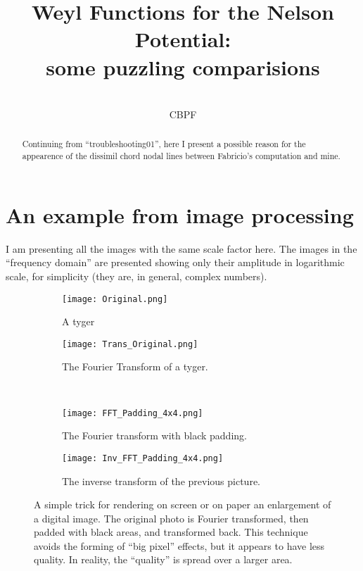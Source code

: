 \documentclass[a4paper,12pt]{article}
\title{ Weyl Functions for the Nelson Potential:\\ some puzzling comparisions}
\author{\\CBPF}
\begin{document}
\maketitle

\begin{abstract}
Continuing from ``troubleshooting01'', here I present a
possible reason for the appearence of the dissimil chord nodal
lines between Fabricio's computation and mine. 
\end{abstract}




\section{An example from image processing}

I am presenting all the images with the same scale factor
here. The images in the ``frequency domain'' are presented showing
only their amplitude in logarithmic scale, for simplicity 
(they are, in general, complex numbers).


\begin{figure}[H]
  \centering
  \begin{subfigure}[b]{0.48\textwidth}
    \centering
          \texttt{[image: Original.png]}
                \caption{A tyger}
                \label{tigre01}
  \end{subfigure}%
\begin{subfigure}[b]{0.48\textwidth}
    \centering
          \texttt{[image: Trans\_Original.png]}
                \caption{The Fourier Transform of a tyger.}
                \label{ftigre01}
  \end{subfigure}
\\
  \begin{subfigure}[b]{0.48\textwidth}
    \centering
          \texttt{[image: FFT\_Padding\_4x4.png]}
                \caption{The Fourier transform with black padding.}
                \label{ftigreynegro01}
  \end{subfigure}%
\begin{subfigure}[b]{0.48\textwidth}
    \centering
          \texttt{[image: Inv\_FFT\_Padding\_4x4.png]}
                \caption{The inverse transform of the previous picture.}
                \label{ftigreynegro01}
  \end{subfigure} 
\caption{ A simple trick for rendering on screen or on paper
an enlargement of a digital image. The original photo is Fourier transformed,
then padded with black areas, and transformed back. This technique 
avoids the forming of ``big pixel'' effects, but it appears to have less
quality. In reality, the ``quality'' is spread over a larger area.
 }\label{ZoomTrick}
\end{figure}
\end{document}
